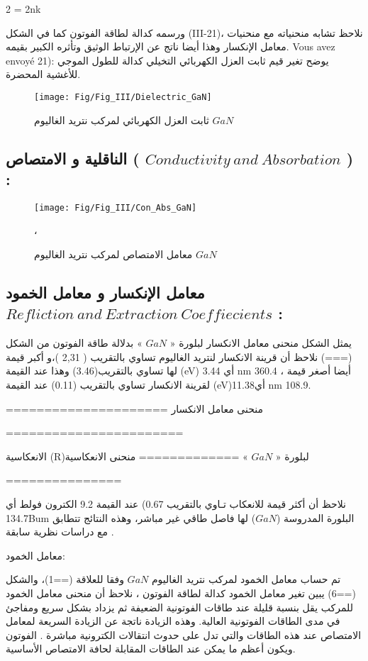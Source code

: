 2 = 2nk

ورسمه كدالة لطاقة الفوتون كما في الشكل (III-21)، نلاحظ تشابه منحنياته مع منحنيات معامل الإنكسار وهذا أيضا ناتج عن الإرتباط الوثيق وتأثره الكبير بقيمه.
Vous avez envoyé
21): يوضح تغير قيم ثابت العزل الكهربائي التخيلي كدالة للطول الموجي للأغشية المحضرة.

\begin{figure}[h!]
	\centering
	\texttt{[image: Fig/Fig\_III/Dielectric\_GaN]}
	\caption{ ثابت العزل الكهربائي لمركب نتريد الغاليوم  $ GaN $  }
	\label{fig:dielectricgan}
\end{figure}
\FloatBarrier

\subsection*{ الناقلية و الامتصاص ( $ Conductivity~and~Absorbation $ ) : }

\begin{figure}[h!]
	\centering
	\texttt{[image: Fig/Fig\_III/Con\_Abs\_GaN]}
	\caption{معامل الامتصاص لمركب نتريد الغاليوم  $ GaN $ }، 
	\label{fig:conabsgan}
\end{figure}
\FloatBarrier

\subsection*{ معامل الإنكسار و معامل الخمود $ Refliction~and~Extraction~Coeffiecients $ : }

يمثل الشكل منحنى معامل الانكسار لبلورة « $ GaN $ » بدلالة طاقة الفوتون
من الشكل (===) نلاحظ أن قرينة الانكسار لنتريد الغاليوم تساوي بالتقريب ( 2,31 )،و أكبر قيمة لها تساوي بالتقريب(3.46) وهذا عند القيمة (eV) 3.44   أي  nm 360.4 ، أيضا أصغر قيمة لقرينة الانكسار تساوي بالتقريب (0.11) عند القيمة (eV)11.38أي nm 108.9.

=====================
منحنى معامل الانكسار

=======================

الانعكاسية (R)لبلورة « $ GaN $ »
=============
منحنى الانعكاسية

===============

نلاحظ أن أكثر قيمة للانعكاب تـاوي بالتقريب 0.67) عند القيمة 9.2 الكترون فولط أي 134.7Bum البلورة المدروسة ($ GaN $) لها فاصل طاقي غير مباشر، وهذه النتائج تتطابق مع دراسات نظرية سابقة .

 معامل الخمود:

تم حساب معامل الخمود لمركب نتريد الغاليوم  $ GaN $ وفقا للعلاقة (==1)، والشكل (==6) يبين تغير معامل الخمود كدالة لطاقة الفوتون ، نلاحظ أن منحنى معامل الخمود للمركب يقل بنسبة قليلة عند طاقات الفوتونية الضعيفة ثم يزداد بشكل سريع ومفاجئ في مدى الطاقات الفوتونية العالية. وهذه الزيادة ناتجة عن الزيادة السريعة لمعامل الامتصاص عند هذه الطاقات والتي تدل على حدوث انتقالات الكترونية مباشرة .
الفوتون ويكون أعظم ما يمكن عند الطاقات المقابلة لحافة الامتصاص الأساسية.


